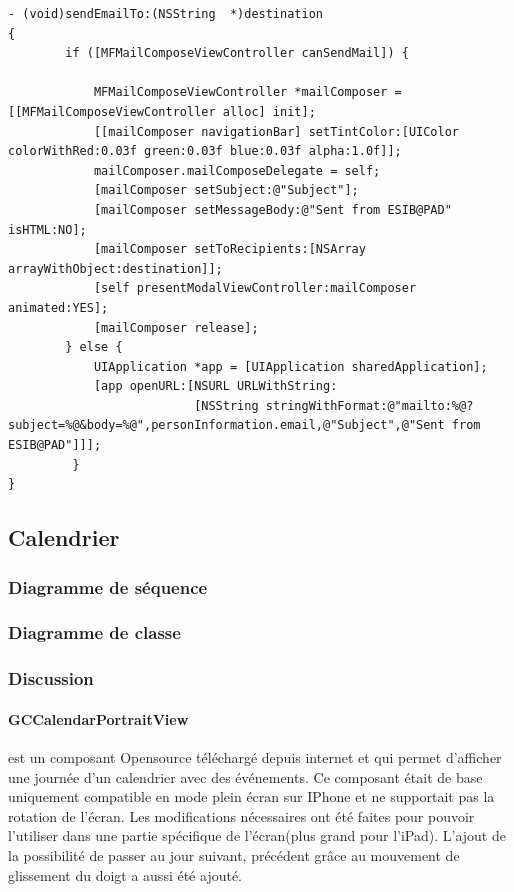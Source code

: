 \begin{lstlisting}[name=Recherche dans UITableView  , label=searchTBV]
- (void)sendEmailTo:(NSString  *)destination
{
		if ([MFMailComposeViewController canSendMail]) {
            
            MFMailComposeViewController *mailComposer = [[MFMailComposeViewController alloc] init];
            [[mailComposer navigationBar] setTintColor:[UIColor colorWithRed:0.03f green:0.03f blue:0.03f alpha:1.0f]];
            mailComposer.mailComposeDelegate = self;
            [mailComposer setSubject:@"Subject"];
            [mailComposer setMessageBody:@"Sent from ESIB@PAD" isHTML:NO];
            [mailComposer setToRecipients:[NSArray arrayWithObject:destination]];
            [self presentModalViewController:mailComposer animated:YES];
            [mailComposer release];
        } else {
            UIApplication *app = [UIApplication sharedApplication];
            [app openURL:[NSURL URLWithString:
                          [NSString stringWithFormat:@"mailto:%@?subject=%@&body=%@",personInformation.email,@"Subject",@"Sent from ESIB@PAD"]]];
         }
}
\end{lstlisting}

	\subsection{Calendrier}
					\subsubsection*{Diagramme de séquence}

					\subsubsection*{Diagramme de classe}
						 	
					\subsubsection*{Discussion}
					\paragraph{GCCalendarPortraitView} est un composant Opensource téléchargé depuis internet et qui permet d'afficher une journée d'un calendrier avec des événements. Ce composant était de base uniquement compatible en mode plein écran sur IPhone et ne supportait pas la rotation de l'écran. Les modifications nécessaires ont été faites pour pouvoir l'utiliser dans une partie spécifique de l'écran(plus grand pour l'iPad). L'ajout de la possibilité de passer au jour suivant, précédent grâce au mouvement de glissement du doigt a aussi été ajouté. 
\lstset{
		style = Xcode,
		caption=Enregistrement pour les notifications du mouvement glissement du doigt et réception de l'événement ,
		breaklines=true,
		frame=single
}
				
